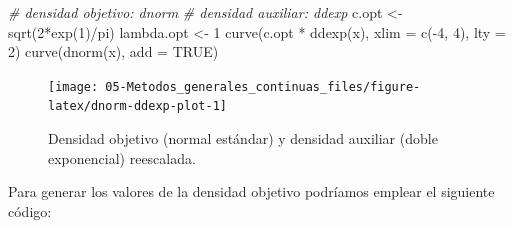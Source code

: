 \documentclass[
]{book}
\newenvironment{Shaded}{\begin{snugshade}}{\end{snugshade}}
\newcommand{\AttributeTok}[1]{\textcolor[rgb]{0.77,0.63,0.00}{#1}}
\newcommand{\CommentTok}[1]{\textcolor[rgb]{0.56,0.35,0.01}{\textit{#1}}}
\newcommand{\ConstantTok}[1]{\textcolor[rgb]{0.00,0.00,0.00}{#1}}
\newcommand{\DecValTok}[1]{\textcolor[rgb]{0.00,0.00,0.81}{#1}}
\newcommand{\FunctionTok}[1]{\textcolor[rgb]{0.00,0.00,0.00}{#1}}
\newcommand{\NormalTok}[1]{#1}
\newcommand{\OtherTok}[1]{\textcolor[rgb]{0.56,0.35,0.01}{#1}}
\newcommand{\SpecialCharTok}[1]{\textcolor[rgb]{0.00,0.00,0.00}{#1}}
\theoremstyle{break}
\theoremstyle{definition}
\theoremstyle{definition}
\theoremstyle{definition}
\theoremstyle{definition}
\theoremstyle{remark}
\begin{document}
\begin{Shaded}
\begin{Highlighting}[]
\CommentTok{\# densidad objetivo: dnorm}
\CommentTok{\# densidad auxiliar: ddexp}
\NormalTok{c.opt }\OtherTok{\textless{}{-}} \FunctionTok{sqrt}\NormalTok{(}\DecValTok{2}\SpecialCharTok{*}\FunctionTok{exp}\NormalTok{(}\DecValTok{1}\NormalTok{)}\SpecialCharTok{/}\NormalTok{pi)}
\NormalTok{lambda.opt }\OtherTok{\textless{}{-}} \DecValTok{1}
\FunctionTok{curve}\NormalTok{(c.opt }\SpecialCharTok{*} \FunctionTok{ddexp}\NormalTok{(x), }\AttributeTok{xlim =} \FunctionTok{c}\NormalTok{(}\SpecialCharTok{{-}}\DecValTok{4}\NormalTok{, }\DecValTok{4}\NormalTok{), }\AttributeTok{lty =} \DecValTok{2}\NormalTok{)}
\FunctionTok{curve}\NormalTok{(}\FunctionTok{dnorm}\NormalTok{(x), }\AttributeTok{add =} \ConstantTok{TRUE}\NormalTok{)}
\end{Highlighting}
\end{Shaded}

\begin{figure}[!htb]

{\centering \texttt{[image: 05-Metodos\_generales\_continuas\_files/figure-latex/dnorm-ddexp-plot-1]} 

}

\caption{Densidad objetivo (normal estándar) y densidad auxiliar (doble exponencial) reescalada.}\label{fig:dnorm-ddexp-plot}
\end{figure}

Para generar los valores de la densidad objetivo podríamos emplear el siguiente código:
\end{document}
